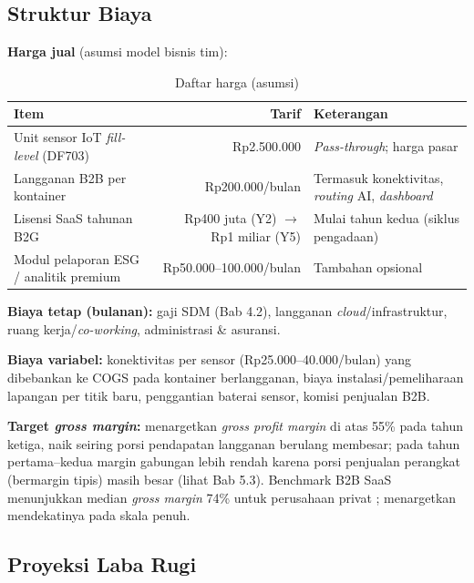 \subsection{Struktur Biaya}
\label{sec:5-2}

\textbf{Harga jual} (asumsi model bisnis tim):
\begin{table}[H]
\footnotesize
\renewcommand{\arraystretch}{0.85}
\begin{tabularx}{\textwidth}{|>{\RaggedRight\arraybackslash}X|r|>{\RaggedRight\arraybackslash}X|}
\hline
\textbf{Item} & \textbf{Tarif} & \textbf{Keterangan} \\
\hline
Unit sensor IoT \textit{fill-level} (DF703) & Rp2.500.000 & \textit{Pass-through}; harga pasar \parencite{microthings2026} \\
\hline
Langganan B2B per kontainer & Rp200.000/bulan & Termasuk konektivitas, \textit{routing} AI, \textit{dashboard} \\
\hline
Lisensi SaaS tahunan B2G & Rp400 juta (Y2) $\rightarrow$ Rp1 miliar (Y5) & Mulai tahun kedua (siklus pengadaan) \\
\hline
Modul pelaporan ESG / analitik premium & Rp50.000--100.000/bulan & Tambahan opsional \\
\hline
\end{tabularx}
\caption{Daftar harga \ProductName{} (asumsi)}
\end{table}

\textbf{Biaya tetap (bulanan):} gaji SDM (Bab 4.2), langganan \textit{cloud}/infrastruktur, ruang kerja/\textit{co-working}, administrasi \& asuransi.

\textbf{Biaya variabel:} konektivitas per sensor (Rp25.000--40.000/bulan) \parencite{telkomseliot2026} yang dibebankan ke COGS pada kontainer berlangganan, biaya instalasi/pemeliharaan lapangan per titik baru, penggantian baterai sensor, komisi penjualan B2B.

\textbf{Target \textit{gross margin}:} \ProductName{} menargetkan \textit{gross profit margin} di atas 55\% pada tahun ketiga, naik seiring porsi pendapatan langganan berulang membesar; pada tahun pertama--kedua margin gabungan lebih rendah karena porsi penjualan perangkat (bermargin tipis) masih besar (lihat Bab 5.3). Benchmark B2B SaaS menunjukkan median \textit{gross margin} 74\% untuk perusahaan privat \parencite{saascapitalmargin2019}; \ProductName{} menargetkan mendekatinya pada skala penuh.

\subsection{Proyeksi Laba Rugi}
\label{sec:5-3}

